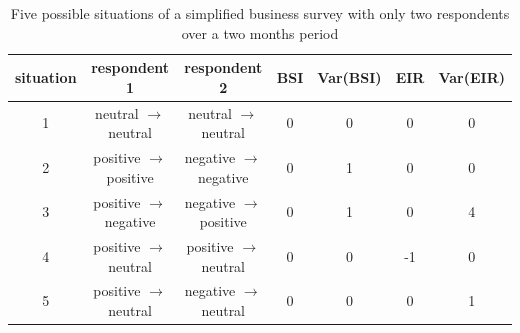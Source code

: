 \documentclass[12pt,a4paper,oneside]{book}
\begin{document}
\begin{table}[H]
    \caption{Five possible situations of a simplified business survey with only two respondents over a two months period}
    \label{tab:explanation of Var and BSI}
    \centering
\begin{tabular}{c|c c c c c c} \footnotesize
situation    & respondent 1 & respondent 2           &  BSI & Var(BSI) & EIR & Var(EIR) \\ \hline
 1 & neutral $\rightarrow$ neutral & neutral $\rightarrow$ neutral & 0 & 0 & 0 & 0   \\
 2 & positive $\rightarrow$ positive & negative $\rightarrow$ negative & 0 & 1 & 0 & 0 \\
 3 & positive $\rightarrow$ negative & negative $\rightarrow$ positive & 0 & 1 & 0 & 4 \\
 4 & positive $\rightarrow$ neutral & positive $\rightarrow$ neutral & 0 & 0 & -1 & 0  \\
 5 & positive $\rightarrow$ neutral & negative $\rightarrow$ neutral & 0 & 0 & 0 & 1  \\
\end{tabular}
\end{table}
%
\end{document}
